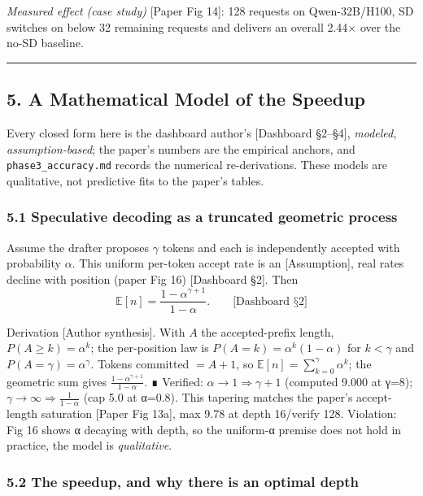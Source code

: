 \documentclass[
  11pt,
  letterpaper,
]{article}
\begin{document}
\emph{Measured effect (case study)} {[}Paper Fig 14{]}: 128 requests on
Qwen-32B/H100, SD switches on below 32 remaining requests and delivers
an overall 2.44× over the no-SD baseline.

\begin{center}\rule{0.5\linewidth}{0.5pt}\end{center}

\subsection{5. A Mathematical Model of the
Speedup}\label{a-mathematical-model-of-the-speedup}

Every closed form here is the dashboard author's {[}Dashboard §2--§4{]},
\emph{modeled, assumption-based}; the paper's numbers are the empirical
anchors, and \texttt{phase3\_accuracy.md} records the numerical
re-derivations. These models are qualitative, not predictive fits to the
paper's tables.

\subsubsection{5.1 Speculative decoding as a truncated geometric
process}\label{speculative-decoding-as-a-truncated-geometric-process}

Assume the drafter proposes \(\gamma\) tokens and each is independently
accepted with probability \(\alpha\). This uniform per-token accept rate
is an {[}Assumption{]}, real rates decline with position (paper Fig 16)
{[}Dashboard §2{]}. Then
\[\mathbb{E}[n] = \frac{1-\alpha^{\gamma+1}}{1-\alpha}.\qquad\text{[Dashboard §2]}\]

Derivation {[}Author synthesis{]}. With \(A\) the accepted-prefix
length, \(P(A\ge k)=\alpha^{k}\); the per-position law is
\(P(A=k)=\alpha^k(1-\alpha)\) for \(k<\gamma\) and
\(P(A=\gamma)=\alpha^\gamma\). Tokens committed \(=A+1\), so
\(\mathbb{E}[n]=\sum_{k=0}^{\gamma}\alpha^k\); the geometric sum gives
\(\frac{1-\alpha^{\gamma+1}}{1-\alpha}\). ∎ Verified:
\(\alpha\to1\Rightarrow\gamma+1\) (computed 9.000 at γ=8);
\(\gamma\to\infty\Rightarrow\frac1{1-\alpha}\) (cap 5.0 at α=0.8). This
tapering matches the paper's accept-length saturation {[}Paper Fig
13a{]}, max 9.78 at depth 16/verify 128. Violation: Fig 16 shows α
decaying with depth, so the uniform-α premise does not hold in practice,
the model is \emph{qualitative}.

\subsubsection{5.2 The speedup, and why there is an optimal
depth}\label{the-speedup-and-why-there-is-an-optimal-depth}
\end{document}
